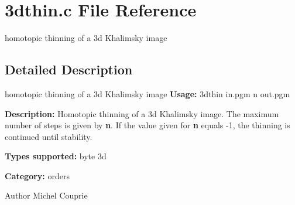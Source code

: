 \section{3dthin.c File Reference}
\label{3dthin_8c}


homotopic thinning of a 3d Khalimsky image  




\subsection{Detailed Description}
homotopic thinning of a 3d Khalimsky image {\bfseries Usage:} 3dthin in.pgm n out.pgm

{\bfseries Description:} Homotopic thinning of a 3d Khalimsky image. The maximum number of steps is given by {\bfseries n}. If the value given for {\bfseries n} equals -\/1, the thinning is continued until stability.

{\bfseries Types supported:} byte 3d

{\bfseries Category:} orders

\begin{DoxyAuthor}{Author}
Michel Couprie 
\end{DoxyAuthor}
